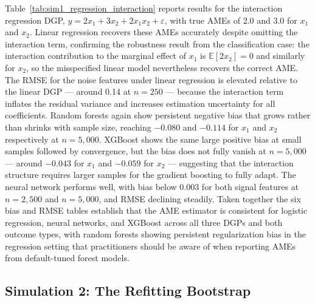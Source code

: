\documentclass[12pt]{article}
\begin{document}
	Table~\ref{tab:sim1_regression_interaction} reports results for the interaction regression DGP, $y = 2x_1 + 3x_2 + 2x_1 x_2 + \varepsilon$, with true AMEs of 2.0 and 3.0 for $x_1$ and $x_2$. Linear regression recovers these AMEs accurately despite omitting the interaction term, confirming the robustness result from the classification case: the interaction contribution to the marginal effect of $x_1$ is $\mathbb{E}[2x_2] = 0$ and similarly for $x_2$, so the misspecified linear model nevertheless recovers the correct AME. The RMSE for the noise features under linear regression is elevated relative to the linear DGP --- around 0.14 at $n=250$ --- because the interaction term inflates the residual variance and increases estimation uncertainty for all coefficients. Random forests again show persistent negative bias that grows rather than shrinks with sample size, reaching $-0.080$ and $-0.114$ for $x_1$ and $x_2$ respectively at $n=5{,}000$. XGBoost shows the same large positive bias at small samples followed by convergence, but the bias does not fully vanish at $n=5{,}000$ --- around $-0.043$ for $x_1$ and $-0.059$ for $x_2$ --- suggesting that the interaction structure requires larger samples for the gradient boosting to fully adapt. The neural network performs well, with bias below 0.003 for both signal features at $n=2{,}500$ and $n=5{,}000$, and RMSE declining steadily. Taken together the six bias and RMSE tables establish that the AME estimator is consistent for logistic regression, neural networks, and XGBoost across all three DGPs and both outcome types, with random forests showing persistent regularization bias in the regression setting that practitioners should be aware of when reporting AMEs from default-tuned forest models.
	
	\subsection{Simulation 2: The Refitting Bootstrap}
	
\end{document}
